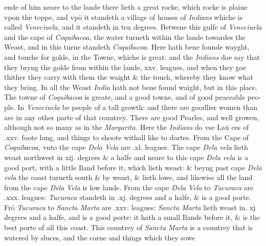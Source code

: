 \documentclass[11pt,twoside]{article}\makeatletter
\begin{document}
	\normalmarginpar
       ende of him neare to the lande there lieth a great rocke, which rocke is plaine vpon the toppe, and vpō it standeth a village of houses of {\itshape Indians} whiche is called {\itshape Veneciuela,} and it standeth 
	\normalmarginpar
       in ten degrees. Betwene this gulfe of {\itshape Veneciuela} and the cape of {\itshape Coquibacoa,} the water turneth within the lande towardes the Weast, and in this turne standeth {\itshape Coquibacoa.} Here hath bene founde wayght, and touche for golde, in the Towne, whiche is great: and the {\itshape Indians} doe say that they bryng the golde from within the lande, xxv. leagues, and when they goe thither they carry with them the waight \& the touch, whereby they know what they bring. In all the Weast {\itshape India} hath not bene found waight, but in this place. The towne of {\itshape Coquiba­coa} is greate, and a good towne, and of good peaceable peo­ple. In {\itshape Veneciuela} be people of a tall growth: and there are goodlier women than are in any other parte of that coun­trey. There are good Pearles, and well growen, although not so many as in the {\itshape Margarita.} Here the {\itshape Indians} do vse Laū ­ces of .xxv. foote long, and things to shoote withall like to dartes. From the Cape of {\itshape Coquibacoa,} vnto the cape {\itshape Dela Vela} are .xl. leagues. The cape {\itshape Dela vela} lieth weast northwest in 
	\normalmarginpar
       xij. degrees \& a halfe and neare to this cape {\itshape Dela vela} is a good port, with a little Iland before it, which lieth weast: \& beyng past cape {\itshape Dela vela} the coast turneth south \& by weast, \& lieth %
 lowe, and likewise all the land from the cape {\itshape Dela Vela} is low lande. From the cape {\itshape Dela Vela} to {\itshape Tucuraca} are .xxx. leagues: {\itshape Tucuraca} standeth in .xj. degrees and a halfe, \& is a good porte. Frō {\itshape Tucuraca} to {\itshape Sancta Marta} are .xxv. leagues: {\itshape Sancta Mar­ta} lieth weast in. xj degrees and a halfe, and is a good porte: 
	\normalmarginpar
       it hath a small Ilande before it, \& is the best porte of all this coast. This countrey of {\itshape Sancta Marta} is a countrey that is watered by sluces, and the corne and things which they sowe 
	\normalmarginpar
\end{document}
